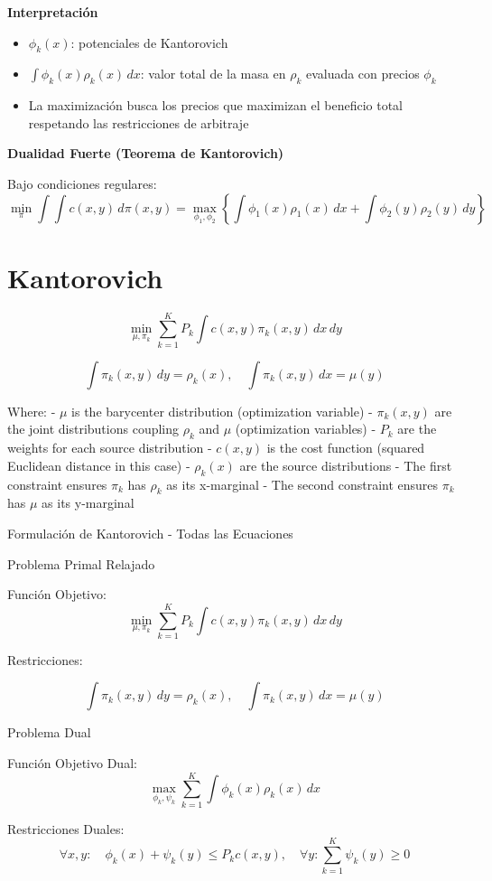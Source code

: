\documentclass{myarticle}
\begin{document}
{\bf Interpretación}

\begin{itemize}
\item $\phi_k(x)$: potenciales de Kantorovich
\item $\int \phi_k(x) \rho_k(x) \, dx$: valor total de la masa en $\rho_k$ evaluada con precios $\phi_k$
\item La maximización busca los precios que maximizan el beneficio total respetando las restricciones de arbitraje
\end{itemize}

  {\bf Dualidad Fuerte (Teorema de Kantorovich)}
  
Bajo condiciones regulares:
\[
\min_{\pi} \int \int c(x,y) \, d\pi(x,y) = \max_{\phi_1, \phi_2} \left\{ \int \phi_1(x) \rho_1(x) \, dx + \int \phi_2(y) \rho_2(y) \, dy \right\}
\]

\section{Kantorovich}
\[\min_{\mu, \pi_k} \sum_{k=1}^{K} P_k \int c(x, y) \pi_k(x, y) \, dx \, dy \]

\[\int \pi_k(x, y) \, dy = \rho_k(x), \quad \int \pi_k(x, y) \, dx = \mu(y)\]

Where:
- $\mu$ is the barycenter distribution (optimization variable)
- $\pi_k(x, y)$ are the joint distributions coupling $\rho_k$ and $\mu$ (optimization variables)  
- $P_k$ are the weights for each source distribution
- $c(x, y)$ is the cost function (squared Euclidean distance in this case)
- $\rho_k(x)$ are the source distributions
- The first constraint ensures $\pi_k$ has $\rho_k$ as its x-marginal
- The second constraint ensures $\pi_k$ has $\mu$ as its y-marginal

Formulación de Kantorovich - Todas las Ecuaciones

Problema Primal Relajado

Función Objetivo:
\[\min_{\mu, \pi_k} \sum_{k=1}^{K} P_k \int c(x, y) \pi_k(x, y) \, dx \, dy \]

Restricciones:

\[\int \pi_k(x, y) \, dy = \rho_k(x), \quad \int \pi_k(x, y) \, dx = \mu(y) \]

Problema Dual

Función Objetivo Dual:
\[\max_{\phi_k, \psi_k} \sum_{k=1}^{K} \int \phi_k(x) \rho_k(x) \, dx \]

Restricciones Duales:
\[\forall x, y: \quad \phi_k(x) + \psi_k(y) \leq P_k c(x, y), \quad \forall y: \sum_{k=1}^{K} \psi_k(y) \geq 0 \]
\end{document}
